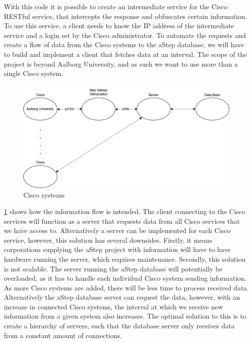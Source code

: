 With this code it is possible to create an intermediate service for the Cisco RESTful service, that intercepts the response and obfuscates certain information. To use this service, a client needs to know the IP address of the intermediate service and a login set by the Cisco administrator. To automate the requests and create a flow of data from the Cisco systems to the aStep database, we will have to build and implement a client that fetches data at an interval. The scope of the project is beyond Aalborg University, and as such we want to use more than a single Cisco system. 

\begin{figure}[ht]
	\begin{center}
	\includegraphics[scale=0.5]{graphics/ciscoSmall.pdf}
	\caption{Cisco systems}
	\label{fig:cisco_systems}
	\end{center} 
\end{figure}
\cref{fig:cisco_systems} shows how the information flow is intended. The client connecting to the Cisco services will function as a server that requests data from all Cisco services that we have access to. Alternatively a server can be implemented for each Cisco service, however, this solution has several downsides. Firstly, it means corporations supplying the aStep project with information will have to have hardware running the server, which requires maintenance. Secondly, this solution is not scalable. The server running the aStep database will potentially be overloaded, as it has to handle each individual Cisco system sending information. As more Cisco systems are added, there will be less time to process received data. Alternatively the aStep database server can request the data, however, with an increase in connected Cisco systems, the interval at which we receive new information from a given system also increases. The optimal solution to this is to create a hierarchy of servers, such that the database server only receives data from a constant amount of connections. 